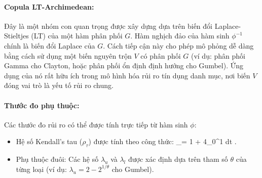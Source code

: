 \paragraph{Copula LT-Archimedean:}
Đây là một nhóm con quan trọng được xây dựng dựa trên biến đổi Laplace-Stieltjes (LT) của một hàm phân phối $G$. Hàm nghịch đảo của hàm sinh $\phi^{-1}$ chính là biến đổi Laplace của $G$. Cách tiếp cận này cho phép mô phỏng dễ dàng bằng cách sử dụng một biến nguyên trộn $V$ có phân phối $G$ (ví dụ: phân phối Gamma cho Clayton, hoặc phân phối ổn định định hướng cho Gumbel). Ứng dụng của nó rất hữu ích trong mô hình hóa rủi ro tín dụng danh mục, nơi biến $V$ đóng vai trò là yếu tố rủi ro chung.

\paragraph{Thước đo phụ thuộc:}
Các thước đo rủi ro có thể được tính trực tiếp từ hàm sinh $\phi$:
\begin{itemize}
    \item Hệ số Kendall's tau ($\rho_\tau$) được tính theo công thức:
    \bea
    \rho_\tau = 1 + 4\int_{0}^{1}  dt .
    \eea
    \item Phụ thuộc đuôi: Các hệ số $\lambda_u$ và $\lambda_l$ được xác định dựa trên tham số $\theta$ của từng loại (ví dụ: $\lambda_u = 2 - 2^{1/\theta}$ cho Gumbel).
\end{itemize}
                                                               